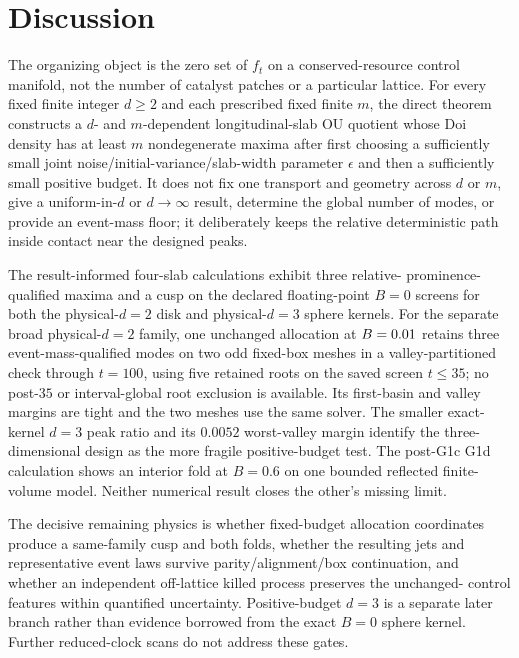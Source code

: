 \documentclass[aps,physrev,reprint,amsmath,amssymb,longbibliography,floatfix]{revtex4-2}
\begin{document}
\section{Discussion}\label{sec:discussion}

The organizing object is the zero set of $f_t$ on a conserved-resource control
manifold, not the number of catalyst patches or a particular lattice.  For
every fixed finite integer $d\ge2$ and each prescribed fixed finite $m$, the
direct theorem constructs a $d$- and $m$-dependent longitudinal-slab OU
quotient whose Doi density has at least $m$ nondegenerate maxima after first
choosing a sufficiently small joint
noise/initial-variance/slab-width parameter $\epsilon$ and then a sufficiently
small positive budget.  It does not fix one transport and geometry across
$d$ or $m$, give a uniform-in-$d$ or $d\to\infty$ result, determine the
global number of modes, or provide an event-mass floor; it
deliberately keeps the relative deterministic path inside contact near the
designed peaks.

The result-informed four-slab calculations exhibit three relative-
prominence-qualified maxima and a cusp on the declared floating-point $B=0$
screens for both the physical-$d=2$ disk and physical-$d=3$ sphere kernels.
For the separate broad physical-$d=2$ family, one unchanged allocation at
$B=0.01$ retains three event-mass-qualified modes on two odd
fixed-box meshes in a valley-partitioned check through $t=100$, using five
retained roots on the saved screen $t\leq35$; no post-$35$ or interval-global
root exclusion is available.  Its first-basin and valley margins are tight and
the two meshes use the same solver.  The smaller exact-kernel $d=3$ peak ratio and its
$0.0052$ worst-valley margin identify the three-dimensional design as the more
fragile positive-budget test.  The post-G1c G1d
calculation shows an interior fold at $B=0.6$ on one bounded reflected
finite-volume model.  Neither numerical result closes the other's missing
limit.

The decisive remaining physics is whether fixed-budget allocation coordinates
produce a same-family cusp and both folds, whether the resulting jets and
representative event laws survive parity/alignment/box continuation, and
whether an independent off-lattice killed process preserves the unchanged-
control features within quantified uncertainty.  Positive-budget $d=3$ is a
separate later branch rather than evidence borrowed from the exact $B=0$
sphere kernel.  Further reduced-clock scans do not address these gates.
\end{document}
